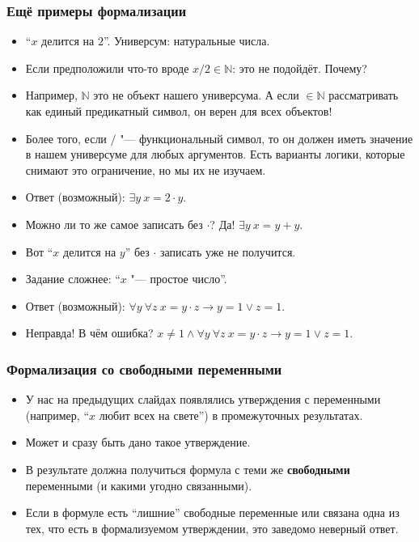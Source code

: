 \documentclass[10pt]{beamer}
\begin{document}
\begin{frame}
    \frametitle{Ещё примеры формализации}
    \begin{itemize}
        \item \enquote{$x$ делится на $2$}. Универсум: натуральные числа.
        \item Если предположили что-то вроде $x / 2 \in \mathbb{N}$: это не подойдёт. Почему? \pause
        \item Например, $\mathbb{N}$ это не объект нашего универсума. А если $\in \mathbb{N}$ рассматривать как единый предикатный символ, он верен для всех объектов! \pause 
        \item Более того, если $/$ "--- функциональный символ, то он должен иметь значение в нашем универсуме для любых аргументов. Есть варианты логики, которые снимают это ограничение, но мы их не изучаем. \pause
        \item Ответ (возможный): \pause $\exists y ~ x = 2 \cdot y$. \pause
        \item Можно ли то же самое записать без $\cdot$? \pause Да! $\exists y ~ x = y + y$. \pause
        \item Вот \enquote{$x$ делится на $y$} без $\cdot$ записать уже не получится. \pause
        \item Задание сложнее: \enquote{$x$ "--- простое число}.
        \item Ответ (возможный): \pause $\forall y ~ \forall z ~ x = y \cdot z \to y = 1 \lor z = 1$. 
        \pause 
        \item Неправда! В чём ошибка? \pause $x \neq 1 \land \forall y ~ \forall z ~ x = y \cdot z \to y = 1 \lor z = 1$. 
    \end{itemize}
\end{frame}

 
\begin{frame}
   \frametitle{Формализация со свободными переменными}
   \begin{itemize}
       \item У нас на предыдущих слайдах появлялись утверждения с переменными (например, \enquote{$x$ любит всех на свете}) в промежуточных результатах. 
       \item Может и сразу быть дано такое утверждение. \pause
       \item В результате должна получиться формула с теми же \textbf<3->{свободными} переменными (и какими угодно связанными). \pause
       \item Если в формуле есть \enquote{лишние} свободные переменные или связана одна из тех, что есть в формализуемом утверждении, это заведомо неверный ответ.
   \end{itemize}
\end{frame}
\end{document}
